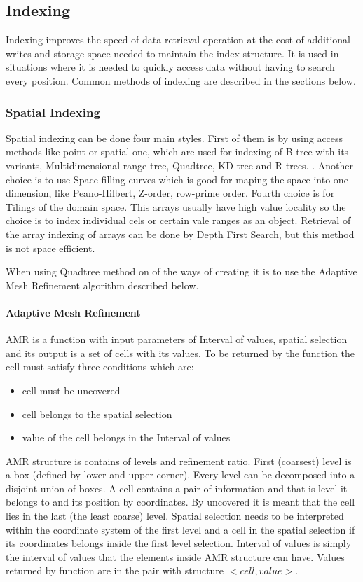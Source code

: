 \subsection{Indexing}\label{indexing}
Indexing improves the speed of data retrieval operation at the cost of additional writes and storage space needed to maintain the index structure. It is used in situations where it is needed to quickly access data without having to search every position. Common methods of indexing are described in the sections below.

\subsubsection{Spatial Indexing}
Spatial indexing can be done four main styles. First of them is by using access methods like point or spatial one, which are used for indexing of B-tree with its variants, Multidimensional range tree, Quadtree, KD-tree and R-trees. \cite{Rtree}. Another choice is to use Space filling curves which is good for maping the space into one dimension, like Peano-Hilbert, Z-order, row-prime order. Fourth choice is for Tilings of the domain space.\cite{joinFractal} This arrays usually have high value locality so the choice is to index individual cels or certain vale ranges as an object. Retrieval of the array indexing of arrays can be done by Depth First Search, but this method is not space efficient. \cite{MDindexingBTree}

When using Quadtree method on of the ways of creating it is to use the Adaptive Mesh Refinement algorithm described below.

\paragraph{Adaptive Mesh Refinement}\label{AMR}
AMR is a function with input parameters of Interval of values, spatial selection and its output is a set of cells with its values. To be returned by the function the cell must satisfy three conditions which are:
\begin{itemize}
\item cell must be uncovered
\item cell belongs to the spatial selection
\item value of the cell belongs in the Interval of values
\end{itemize}
AMR structure is contains of levels and refinement ratio. \cite{AMRindexing} First (coarsest) level is a box (defined by lower and upper corner). Every level can be decomposed into a disjoint union of boxes. A cell contains a pair of information and that is level it belongs to and its position by coordinates. By uncovered it is meant that the cell lies in the last (the least coarse) level. Spatial selection needs to be interpreted within the coordinate system of the first level and a cell in the spatial selection if its coordinates belongs inside the first level selection. Interval of values is simply the interval of values that the elements inside AMR structure can have. Values returned by function are in the pair with structure $<cell, value>$.

